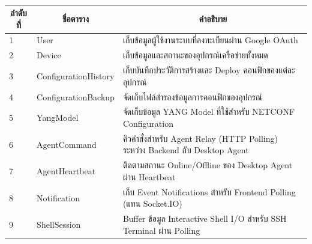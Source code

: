 \begin{table}[H]
    \caption{}
    \label{tab:database_tables}
    \fontSixTeen 
    \begin{tabularx}{\textwidth}{|l|l|X|} 
        \hline
        \multicolumn{1}{|c|}{\textbf{ลำดับที่}} & \multicolumn{1}{c|}{\textbf{ชื่อตาราง}} & \multicolumn{1}{c|}{\textbf{คำอธิบาย}} \\
        \hline
        1 & User & เก็บข้อมูลผู้ใช้งานระบบที่ลงทะเบียนผ่าน Google OAuth \\
        \hline
        2 & Device & เก็บข้อมูลและสถานะของอุปกรณ์เครือข่ายทั้งหมด \\
        \hline
        3 & ConfigurationHistory & เก็บบันทึกประวัติการสร้างและ Deploy คอนฟิกของแต่ละอุปกรณ์ \\
        \hline
        4 & ConfigurationBackup & จัดเก็บไฟล์สำรองข้อมูลการคอนฟิกของอุปกรณ์ \\
        \hline
        5 & YangModel & จัดเก็บข้อมูล YANG Model ที่ใช้สำหรับ NETCONF Configuration \\
        \hline
        6 & AgentCommand & คิวคำสั่งสำหรับ Agent Relay (HTTP Polling) ระหว่าง Backend กับ Desktop Agent \\
        \hline
        7 & AgentHeartbeat & ติดตามสถานะ Online/Offline ของ Desktop Agent ผ่าน Heartbeat \\
        \hline
        8 & Notification & เก็บ Event Notifications สำหรับ Frontend Polling (แทน Socket.IO) \\
        \hline
        9 & ShellSession & Buffer ข้อมูล Interactive Shell I/O สำหรับ SSH Terminal ผ่าน Polling \\
        \hline
    \end{tabularx}
\end{table}


